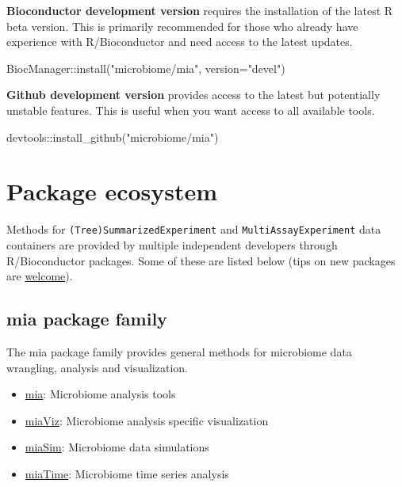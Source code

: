 \documentclass[
]{book}
\newenvironment{Shaded}{\begin{snugshade}}{\end{snugshade}}
\newcommand{\AttributeTok}[1]{\textcolor[rgb]{0.77,0.63,0.00}{#1}}
\newcommand{\FunctionTok}[1]{\textcolor[rgb]{0.00,0.00,0.00}{#1}}
\newcommand{\NormalTok}[1]{#1}
\newcommand{\SpecialCharTok}[1]{\textcolor[rgb]{0.00,0.00,0.00}{#1}}
\newcommand{\StringTok}[1]{\textcolor[rgb]{0.31,0.60,0.02}{#1}}
\providecommand{\tightlist}{%
  \setlength{\itemsep}{0pt}\setlength{\parskip}{0pt}}
\begin{document}
\textbf{Bioconductor development version} requires the installation of the
latest R beta version. This is primarily recommended for those who
already have experience with R/Bioconductor and need access to the
latest updates.

\begin{Shaded}
\begin{Highlighting}[]
\NormalTok{BiocManager}\SpecialCharTok{::}\FunctionTok{install}\NormalTok{(}\StringTok{"microbiome/mia"}\NormalTok{, }\AttributeTok{version=}\StringTok{"devel"}\NormalTok{)}
\end{Highlighting}
\end{Shaded}

\textbf{Github development version} provides access to the latest but
potentially unstable features. This is useful when you want access to
all available tools.

\begin{Shaded}
\begin{Highlighting}[]
\NormalTok{devtools}\SpecialCharTok{::}\FunctionTok{install\_github}\NormalTok{(}\StringTok{"microbiome/mia"}\NormalTok{)}
\end{Highlighting}
\end{Shaded}

\hypertarget{ecosystem}{%
\section{Package ecosystem}\label{ecosystem}}

Methods for \texttt{(Tree)SummarizedExperiment} and \texttt{MultiAssayExperiment}
data containers are provided by multiple independent developers
through R/Bioconductor packages. Some of these are listed below (tips
on new packages are \href{https://microbiome.github.io}{welcome}).

\hypertarget{mia-package-family}{%
\subsection{mia package family}\label{mia-package-family}}

The mia package family provides general methods for microbiome data wrangling, analysis and visualization.

\begin{itemize}
\tightlist
\item
  \href{https://microbiome.github.io/mia/}{mia}: Microbiome analysis tools \citep{R_mia}
\item
  \href{https://microbiome.github.io/miaViz/}{miaViz}: Microbiome analysis specific visualization \citep{Ernst2022}
\item
  \href{https://microbiome.github.io/miaSim/}{miaSim}: Microbiome data simulations \citep{Simsek2021}
\item
  \href{https://microbiome.github.io/miaTime/}{miaTime}: Microbiome time series analysis \citep{Lahti2021}
\end{itemize}
\end{document}
